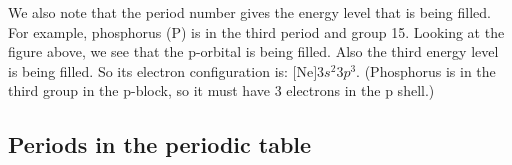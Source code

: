 \begin{figure}[H]
 \begin{center}
 \end{center}
\end{figure}
We also note that the period number gives the energy level that is being filled. For example, phosphorus ($\text{P}$) is in the third period and group 15. Looking at the figure above, we see that the p-orbital is being filled. Also the third energy level is being filled. So its electron configuration is: $\text{[Ne]}3s^{2}3p^{3}$. (Phosphorus is in the third group in the p-block, so it must have 3 electrons in the p shell.) 
      \label{m38760*uid146}
            \subsection*{Periods in the periodic table}
            \nopagebreak

